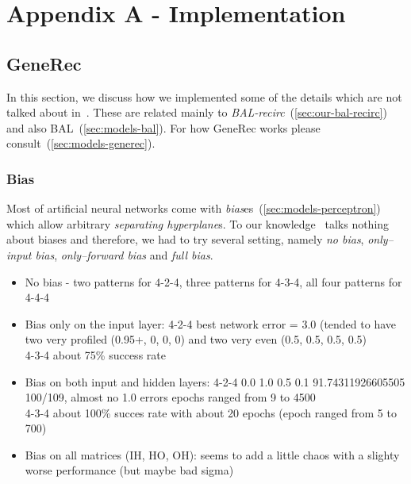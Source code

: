 
\section*{Appendix A - Implementation}
\appendix
{}
\label{sec:appendix-impl} 


\subsection*{GeneRec} 
\label{sec:appendix-impl-generec} 

In this section, we discuss how we implemented some of the details which are not talked about in~\citet{o1996bio}. These are related mainly to \emph{BAL-recirc}~(\ref{sec:our-bal-recirc}) and also BAL~(\ref{sec:models-bal}). For how GeneRec works please consult~(\ref{sec:models-generec}).  

\subsubsection*{Bias} 

Most of artificial neural networks come with \emph{bias}es~(\ref{sec:models-perceptron}) which allow arbitrary \emph{separating hyperplane}s. To our knowledge~\citet{o1996bio} talks nothing about biases and therefore, we had to try several setting, namely \emph{no bias}, \emph{only--input bias}, \emph{only--forward bias} and \emph{full bias}. %

\begin{itemize} 
\item No bias - two patterns for 4-2-4, three patterns for 4-3-4, all four patterns for 4-4-4
\item Bias only on the input layer:  
4-2-4 best network error = 3.0 (tended to have two very profiled (0.95+, 0, 0, 0) and two very even (0.5, 0.5, 0.5, 0.5)  \\
4-3-4 about 75\% success rate 
\item Bias on both input and hidden layers: 
    4-2-4 0.0 1.0 0.5 0.1 91.74311926605505 100/109, almost no 1.0 errors 
          epochs ranged from 9 to 4500 \\ 
    4-3-4 about 100\% succes rate with about 20 epochs (epoch ranged from 5 to 700) 
\item Bias on all matrices (IH, HO, OH): 
    seems to add a little chaos with a slighty worse performance (but maybe bad sigma)

\end{itemize} 

